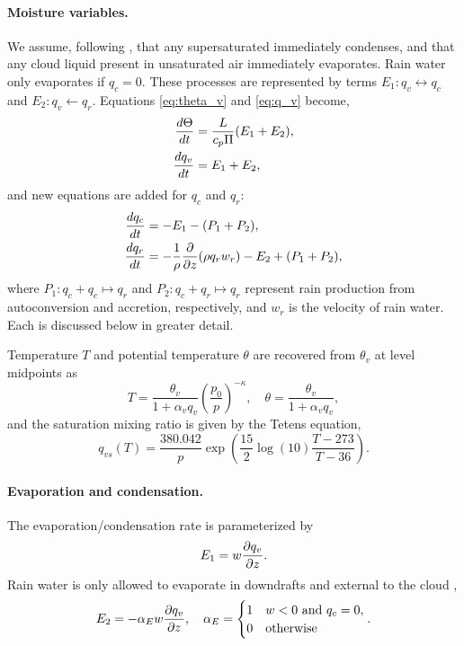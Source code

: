 \paragraph{Moisture variables.}
We assume, following \cite{SoongOgura1973,KlempWilhelmson1978}, that any supersaturated immediately condenses, and that any cloud liquid present in unsaturated air immediately evaporates.
Rain water only evaporates if $q_c = 0$.
These processes are represented by terms $E_1:q_v\leftrightarrow q_c$ and $E_2:q_v \leftarrow q_r$.
Equations \eqref{eq:theta_v} and \eqref{eq:q_v} become,
\begin{align}
  \frac{ d \Theta}{d t} &= \frac{L}{c_p \Pi }(E_1 + E_2), \\
  \frac{ d q_v}{d t} &= E_1 + E_2,
\end{align}
and new equations are added for $q_c$ and $q_r$:
\begin{align}
  \frac{ d q_c}{d t} &= -E_1 - (P_1 + P_2),\label{eq:cloud_water} \\
  \frac{ d q_r}{d t} &= -\frac{1}{\rho}\frac{\partial  }{\partial z}(\rho q_r w_r) - E_2 + (P_1 + P_2), \label{eq:rain_water}
\end{align}
where $P_1:q_c+q_c\mapsto q_r$ and $P_2:q_c+q_r\mapsto q_r$ represent rain production from autoconversion and accretion, respectively, and $w_r$ is the velocity of rain water. Each is discussed below in greater detail.

Temperature $T$ and potential temperature $\theta$ are recovered from $\theta_v$ at level midpoints as
\begin{equation}\label{eq:temperature}
  T = \frac{\theta_v}{1+\alpha_v q_v} \left(\frac{p_0}{p}\right)^{-\kappa}, \quad \theta = \frac{\theta_v}{1+\alpha_vq_v},
\end{equation}
and the saturation mixing ratio is given by the Tetens equation,
\begin{equation}\label{eq:tetens}
  q_{vs}(T) = \frac{380.042}{p}\exp\left(\frac{15}{2}\log(10) \frac{T-273}{T-36}\right).
\end{equation}

  
\paragraph{Evaporation and condensation.}
The evaporation/condensation rate is parameterized by \cite[eqn.~(5)]{Srivastava1967}
\begin{equation}\label{eq:evap_param}
  E_1 = w\frac{\partial q_v }{\partial z}.
\end{equation}
Rain water is only allowed to evaporate in downdrafts and external to the cloud  \cite[eqn.~(10)]{Srivastava1967},
\begin{equation}\label{eq:rain_evap_param}
  E_2 = -\alpha_E w \frac{\partial q_v }{\partial z}, \quad \alpha_E = \begin{cases} 1 & w<0 \text{ and } q_c = 0,\\
 0 & \text{otherwise}  
 \end{cases}.
\end{equation}

